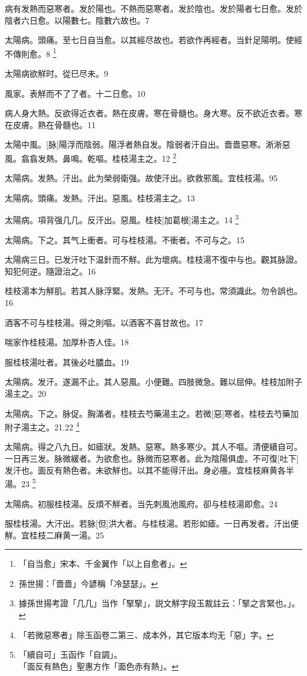 \documentclass[12pt,oneside,UTF8,b5paper]{ctexbook}她她她她她她她
\begin{document}
病有发熱而惡寒者。发於陽也。不熱而惡寒者。发於陰也。发於陽者七日愈。发於陰者六日愈。以陽數七。陰數六故也。7

太陽病。頭痛。至七日自当愈。以其經尽故也。若欲作再經者。当針足陽明。使經不傳則愈。8
	\footnote{「自当愈」宋本、千金翼作「以上自愈者」。}

太陽病欲觧时。從巳尽未。9

風家。表觧而不了了者。十二日愈。10

病人身大熱。反欲得近衣者。熱在皮膚。寒在骨髓也。身大寒。反不欲近衣者。寒在皮膚。熱在骨髓也。11

太陽中風。[脉]陽浮而陰弱。陽浮者熱自发。陰弱者汗自出。嗇嗇惡寒。淅淅惡風。翕翕发熱。鼻鳴。乾嘔。桂枝湯主之。12
	\footnote{孫世揚：「嗇嗇」今諺稱「冷瑟瑟」。}

太陽病。发熱。汗出。此为榮弱衛强。故使汗出。欲救邪風。宜桂枝湯。95

太陽病。頭痛。发熱。汗出。惡風。桂枝湯主之。13

太陽病。項背强几几。反汗出。惡風。桂枝[加葛根]湯主之。14
	\footnote{據孫世揚考證「几几」当作「掔掔」，説文觧字段玉裁註云：「掔之言緊也。」。}

太陽病。下之。其气上衝者。可与桂枝湯。不衝者。不可与之。15

太陽病三日。已发汗吐下温針而不觧。此为壞病。桂枝湯不復中与也。觀其脉證。知犯何逆。隨證治之。16

桂枝湯本为觧肌。若其人脉浮緊。发熱。无汗。不可与也。常須識此。勿令誤也。16

酒客不可与桂枝湯。得之則嘔。以酒客不喜甘故也。17

喘家作桂枝湯。加厚朴杏人佳。18

服桂枝湯吐者。其後必吐膿血。19

太陽病。发汗。遂漏不止。其人惡風。小便難。四肢微急。難以屈伸。桂枝加附子湯主之。20

太陽病。下之。脉促。胸滿者。桂枝去芍藥湯主之。若微[惡]寒者。桂枝去芍藥加附子湯主之。21.22
	\footnote{「若微惡寒者」除玉函卷二第三、成本外，其它版本均无「惡」字。}


太陽病。得之八九日。如瘧狀。发熱。惡寒。熱多寒少。其人不嘔。清便續自可。一日再三发。脉微緩者。为欲愈也。脉微而惡寒者。此为陰陽俱虚。不可復[吐下]发汗也。面反有熱色者。未欲觧也。以其不能得汗出。身必癢。宜桂枝麻黄各半湯。23
	\footnote{「續自可」玉函作「自調」。\\「面反有熱色」聖惠方作「面色赤有熱」。}

太陽病。初服桂枝湯。反煩不觧者。当先刺風池風府。卻与桂枝湯即愈。24

服桂枝湯。大汗出。若脉[但]洪大者。与桂枝湯。若形如瘧。一日再发者。汗出便觧。宜桂枝二麻黄一湯。25
\end{document}
